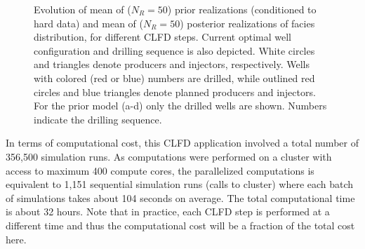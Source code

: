 \documentclass[11pt]{article}
\begin{document}
\begin{figure}
\centering
%
\caption{Evolution of mean of ($N_R = 50$) prior realizations (conditioned to hard data) and mean of ($N_R = 50$) posterior realizations
of facies distribution, for different CLFD steps.
Current optimal well configuration and drilling sequence is also depicted.
White circles and triangles denote producers and injectors, respectively. Wells with colored (red or blue) numbers are drilled,
while outlined red circles and blue triangles denote planned producers and injectors.
For the prior model (a-d) only the drilled wells are shown.
Numbers indicate the drilling sequence.}
\label{fig:ex4-evolmean}
\end{figure}


In terms of computational cost, this CLFD application involved a total number of 356,500 simulation runs.
As computations were performed on a cluster with access to maximum 400 compute cores, the parallelized computations is equivalent
to 1,151 sequential simulation runs (calls to cluster) where each batch of simulations takes about 104 seconds on average.
The total computational time is about 32 hours. Note that in practice, each CLFD step is performed
at a different time and thus the computational cost will be a fraction of the total cost here.
\end{document}
